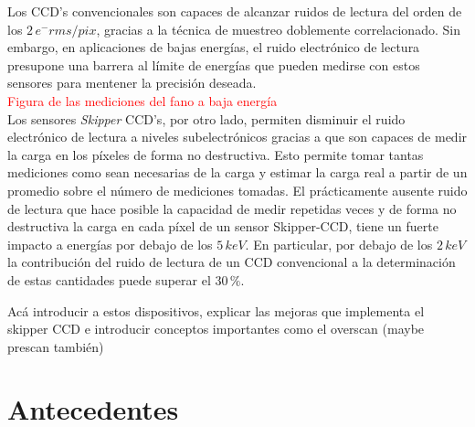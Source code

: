 Los CCD's convencionales son capaces de alcanzar ruidos de lectura del orden de los $2\,e^{-}\si{rms/pix}$, gracias a la técnica de muestreo doblemente correlacionado. Sin embargo, en aplicaciones de bajas energías, el ruido electrónico de lectura presupone una barrera al límite de energías que pueden medirse con estos sensores para mentener la precisión deseada.\\
\textcolor{red}{Figura de las mediciones del fano a baja energía}\\
\indent Los sensores \textit{Skipper} CCD's, por otro lado, permiten disminuir el ruido electrónico de lectura a niveles subelectrónicos gracias a que son capaces de medir la carga en los píxeles de forma no destructiva. Esto permite tomar tantas mediciones como sean necesarias de la carga y estimar la carga real a partir de un promedio sobre el número de mediciones tomadas. El prácticamente ausente ruido de lectura que hace posible la capacidad de medir repetidas veces y de forma no destructiva la carga en cada píxel de un sensor Skipper-CCD, tiene un fuerte impacto a energías por debajo de los $5\,\si{keV}$. En particular, por debajo de los $2\,\si{keV}$ la contribución del ruido de lectura de un CCD convencional a la determinación de estas cantidades puede superar el $30\,\%$. %


Acá introducir a estos dispositivos, explicar las mejoras que implementa el skipper CCD e introducir conceptos importantes como el overscan (maybe prescan también)
\section{Antecedentes}


